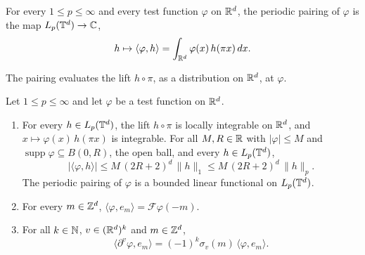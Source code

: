 \begin{definition}
\label{def:torus-periodic-pairing}
\leanok
{}
For every $1 \leq p \leq \infty$ and every test function $\varphi$ on $\mathbb{R}^d$, the periodic pairing
of $\varphi$ is the map $L_p(\mathbb{T}^d) \to \mathbb{C}$,
\[
  h \mapsto \langle \varphi, h \rangle = \int_{\mathbb{R}^d} \varphi(x) \, h(\pi x) \, dx .
\]
\end{definition}

The pairing evaluates the lift $h \circ \pi$, as a distribution on $\mathbb{R}^d$, at $\varphi$.

\begin{lemma}
\label{lem:torus-periodic-pairing}
\leanok
{}
Let $1 \leq p \leq \infty$ and let $\varphi$ be a test function on $\mathbb{R}^d$.
\begin{enumerate}
  \item For every $h \in L_p(\mathbb{T}^d)$, the lift $h \circ \pi$ is locally integrable on $\mathbb{R}^d$, and
    $x \mapsto \varphi(x) \, h(\pi x)$ is integrable. For all $M, R \in \mathbb{R}$ with
    $|\varphi| \leq M$ and $\operatorname{supp} \varphi \subseteq B(0, R)$, the open ball, and
    every $h \in L_p(\mathbb{T}^d)$,
    \[
      |\langle \varphi, h \rangle| \leq M \, (2R + 2)^d \, \|h\|_1
        \leq M \, (2R + 2)^d \, \|h\|_p .
    \]
    The periodic pairing of $\varphi$ is a bounded linear functional on $L_p(\mathbb{T}^d)$.
  \item For every $m \in \mathbb{Z}^d$, $\langle \varphi, e_m \rangle = \mathcal{F}\varphi(-m)$.
  \item For all $k \in \mathbb{N}$, $v \in (\mathbb{R}^d)^k$ and $m \in \mathbb{Z}^d$,
    \[
      \langle \partial^v \varphi, e_m \rangle = (-1)^k \sigma_v(m) \, \langle \varphi, e_m \rangle .
    \]
\end{enumerate}
\end{lemma}

